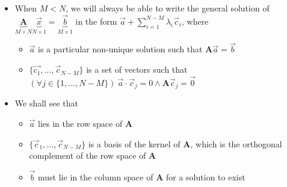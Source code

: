 \documentclass{article}
\begin{document}
\begin{itemize}
\begin{itemize}
        \[
        \left[ \begin{array}{ccc}
            1 & 1 & 1 \\
            0 & 1 & 1  
        \end{array} \right] \left[ \begin{array}{c}
            0 \\
            -1 \\
            0
        \end{array} \right] = \left[ \begin{array}{c}
            0 \\
            0
        \end{array} \right]
        \]
        \item The three vectors formed from the columns of $\left[ \begin{array}{ccc}
            1 & 1 & 1 \\
            0 & 1 & 1  
        \end{array} \right]$ are a trivial example of a non-linearly independent set.
        \item The solution set describes the general solution and any one solution is called a particular solution.
    \end{itemize}
    \item When $M < N$, we will always be able to write the general solution of $\underset{M \times N}{\underbrace{\bm{A}}} \underset{N \times 1}{\underbrace{\vec{x}}} = \underset{M \times 1}{\underbrace{\vec{b}}}$ in the form $\vec{a} + \sum_{i=1}^{N-M} \lambda_i \vec{c}_i$, where
    \begin{itemize}
        \item $\vec{a}$ is a particular non-unique solution such that $\bm{A} \vec{a} = \vec{b}$
        \item $\{\vec{c_1}, \dots, \vec{c}_{N-M} \}$ is a set of vectors such that $(\forall j \in \{ 1, \dots, N-M \}) \ \vec{a} \cdot \vec{c}_j = 0 \wedge \bm{A} \vec{c}_j = \vec{0}$
    \end{itemize}
    \item We shall see that
    \begin{itemize}
        \item $\vec{a}$ lies in the row space of $\bm{A}$
        \item $\{ \vec{c}_1, \dots, \vec{c}_{N-M} \}$ is a basis of the kernel of $\bm{A}$, which is the orthogonal complement of the row space of $\bm{A}$
        \item $\vec{b}$ must lie in the column space of $\bm{A}$ for a solution to exist

\end{itemize}
\end{itemize}
\end{document}
